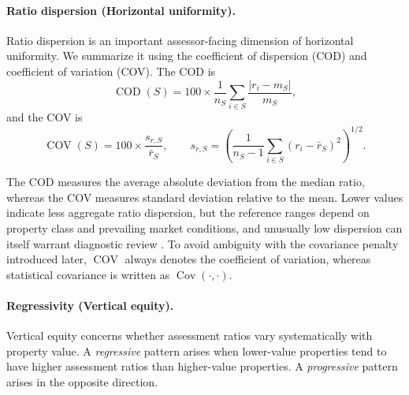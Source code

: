 \documentclass[10pt]{article}
\theoremstyle{definition}
\newcommand{\1}{\mathbf{1}}
\begin{document}

\paragraph{Ratio dispersion (Horizontal uniformity).}
Ratio dispersion is an important assessor-facing dimension of horizontal uniformity. We summarize it using the coefficient of dispersion (COD) and coefficient of variation (COV). The COD is
\begin{equation}
\label{eq:cod}
\operatorname{COD}(S)
=
100\times
\frac{1}{n_S}
\sum_{i\in S}
\frac{|r_i-m_S|}{m_S},
\end{equation}
and the COV is
\begin{equation}
\label{eq:cov}
\operatorname{COV}(S)
=
100\times
\frac{s_{r,S}}{\bar r_S},
\qquad
s_{r,S}
=
\left(
\frac{1}{n_S-1}
\sum_{i\in S}(r_i-\bar r_S)^2
\right)^{1/2}.
\end{equation}


{The COD measures the average absolute deviation from the median ratio, whereas the COV measures standard deviation relative to the mean. Lower values indicate less aggregate ratio dispersion, but the reference ranges depend on property class and prevailing market conditions, and unusually low dispersion can itself warrant diagnostic review \cite{IAAO2013Ratio,IAAO2026ExposureRatio}.}
To avoid ambiguity with the covariance penalty introduced later, $\operatorname{COV}$ always denotes the coefficient of variation, whereas statistical covariance is written as $\operatorname{Cov}(\cdot,\cdot)$.

\paragraph{Regressivity (Vertical equity).}
Vertical equity concerns whether assessment ratios vary systematically with property value. A \emph{regressive} pattern arises when lower-value properties tend to have higher assessment ratios than higher-value properties. A \emph{progressive} pattern arises in the opposite direction.
\end{document}
